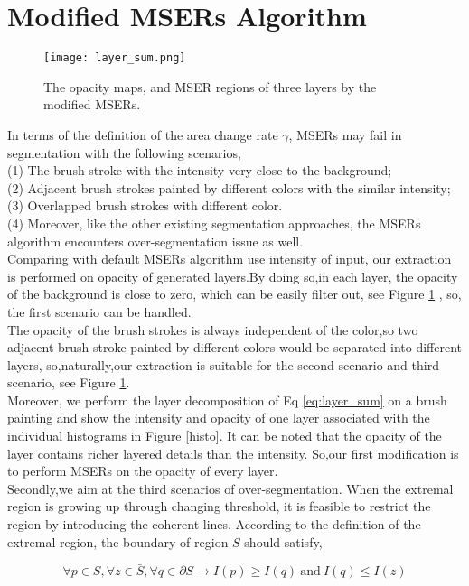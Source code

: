 \section{Modified MSERs Algorithm}
\begin{figure}[H]
	\centering 
	\texttt{[image: layer\_sum.png]}
	\caption{The opacity maps, and MSER regions of three layers by the modified MSERs.}
	\label{mser:alpha}
\end{figure}
In terms of the definition of the area change rate $\gamma$, MSERs may fail in segmentation with the following scenarios,\\
(1) The brush stroke with the intensity very close to the background; \\
(2) Adjacent brush strokes painted by different colors with the similar intensity;\\
(3) Overlapped brush strokes with different color.\\ 
(4) Moreover, like the other existing segmentation approaches, the MSERs algorithm encounters over-segmentation issue as well. 
\\
Comparing with default MSERs algorithm use intensity of input, our extraction is performed on opacity of generated layers.By doing so,in each layer, the opacity of the background is close to zero, which can be easily filter out, see Figure \ref{mser:alpha} , so, the first scenario can be handled. \\
The opacity of the brush strokes is always independent of the color,so two adjacent brush stroke painted by different colors would be separated into different layers, so,naturally,our extraction is suitable for the second scenario and third scenario, see Figure \ref{mser:alpha}. \\
Moreover, we perform the layer decomposition of Eq \ref{eq:layer_sum} on a brush painting and show the intensity and opacity of one layer associated with the individual histograms in Figure \ref{histo}. It can be noted that the opacity of the layer contains richer layered details than the intensity. So,our first modification is to perform MSERs on the opacity of every layer.\\
Secondly,we aim at the third scenarios of over-segmentation. When the extremal region is growing up through changing threshold, it is feasible to restrict the region by introducing the coherent lines. According to the definition of the extremal region, the boundary of region $S$ should satisfy,

\begin{equation*}
 \forall p \in S,\forall z \in   \bar{S} , \forall q \in \partial S \longrightarrow I(p) \geq I(q)  ~\mathrm{and}~  I(q) \leq I(z)
\end{equation*}
 
